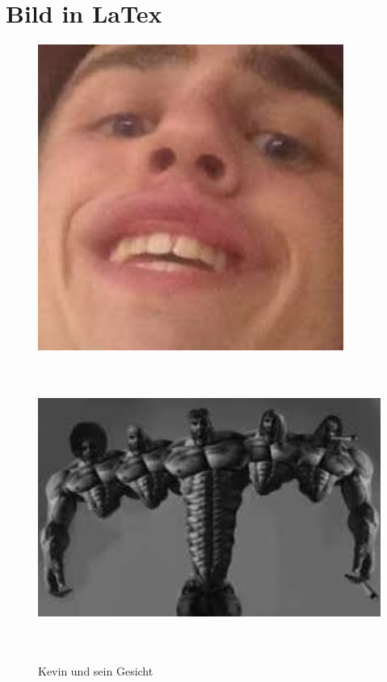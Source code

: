 \documentclass[12pt, a4paper]{article} %
\begin{document}
\section{Bild in LaTex}
\begin{figure} 
\includegraphics[height=100mm]{Kevin.jpeg}
\caption{Kevin und sein Gesicht}

\includegraphics[height=100mm]{Gigachad.jpeg}
\end{figure}
\begin{figure}[h]%
\centering %
\end{figure}
\end{document}
